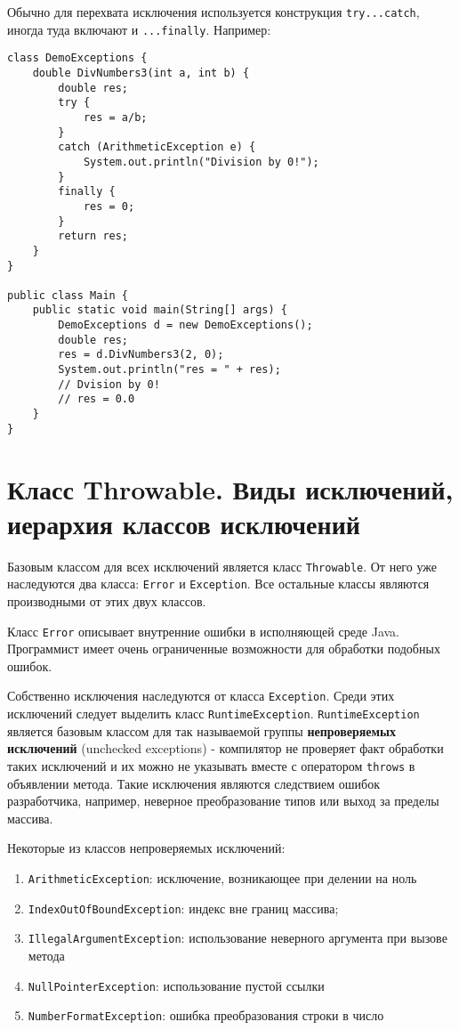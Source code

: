 Обычно для перехвата исключения используется конструкция \verb|try...catch|, иногда туда включают и \verb|...finally|. Например:

\begin{lstlisting}
class DemoExceptions {
    double DivNumbers3(int a, int b) {
        double res;
        try {
            res = a/b;
        }
        catch (ArithmeticException e) {
            System.out.println("Division by 0!");
        }
        finally {
            res = 0;
        }
        return res;
    }
}

public class Main {
    public static void main(String[] args) {
        DemoExceptions d = new DemoExceptions();
        double res;
        res = d.DivNumbers3(2, 0);
        System.out.println("res = " + res);
        // Dvision by 0!
        // res = 0.0
    }
}
\end{lstlisting}

\section{Класс Throwable. Виды исключений, иерархия классов исключений}

Базовым классом для всех исключений является класс \verb|Throwable|. От него уже наследуются два класса: \verb|Error| и \verb|Exception|. Все остальные классы являются производными от этих двух классов.

Класс \verb|Error| описывает внутренние ошибки в исполняющей среде Java. Программист имеет очень ограниченные возможности для обработки подобных ошибок.

Собственно исключения наследуются от класса \verb|Exception|. Среди этих исключений следует выделить класс \verb|RuntimeException|. \verb|RuntimeException| является базовым классом для так называемой группы \textbf{непроверяемых исключений} (unchecked exceptions) - компилятор не проверяет факт обработки таких исключений и их можно не указывать вместе с оператором \verb|throws| в объявлении метода. Такие исключения являются следствием ошибок разработчика, например, неверное преобразование типов или выход за пределы массива.

Некоторые из классов непроверяемых исключений:
\begin{enumerate}
    \item \verb|ArithmeticException|: исключение, возникающее при делении на ноль
    \item \verb|IndexOutOfBoundException|: индекс вне границ массива;
    \item \verb|IllegalArgumentException|: использование неверного аргумента при вызове метода
    \item \verb|NullPointerException|: использование пустой ссылки
    \item \verb|NumberFormatException|: ошибка преобразования строки в число
\end{enumerate}

